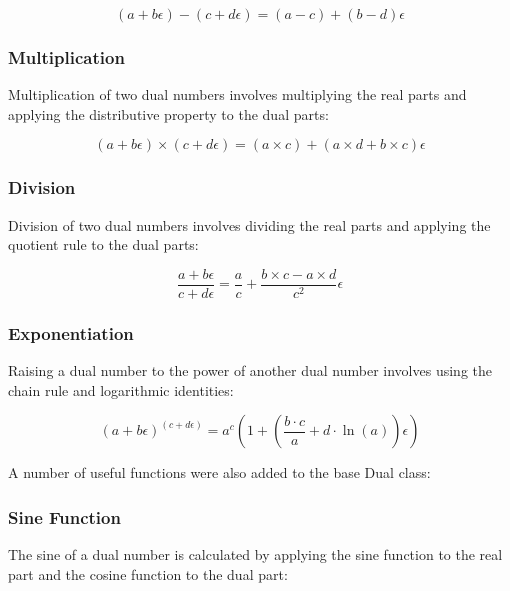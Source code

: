 \begin{equation}
    (a + b\epsilon) - (c + d\epsilon) = (a - c) + (b - d)\epsilon
    \label{eq:subtraction}
    \end{equation}

\subsubsection{Multiplication}
Multiplication of two dual numbers involves multiplying the real parts and applying the distributive property to the dual parts:

\begin{equation}
    (a + b\epsilon) \times (c + d\epsilon) = (a \times c) + (a \times d + b \times c)\epsilon
    \label{eq:multiplication}
    \end{equation}

\subsubsection{Division}
Division of two dual numbers involves dividing the real parts and applying the quotient rule to the dual parts:

\begin{equation}
    \frac{a + b\epsilon}{c + d\epsilon} = \frac{a}{c} + \frac{b \times c - a \times d}{c^2}\epsilon
    \label{eq:division}
\end{equation}

\subsubsection{Exponentiation}
Raising a dual number to the power of another dual number involves using the chain rule and logarithmic identities:

\begin{equation}
    (a + b\epsilon)^{(c + d\epsilon)} = a^c \left(1 + \left(\frac{b \cdot c}{a} + d \cdot \ln(a)\right)\epsilon\right)
    \label{eq:exponentiation}
\end{equation}

A number of useful functions were also added to the base Dual class:

\subsubsection{Sine Function}
The sine of a dual number is calculated by applying the sine function to the real part and the cosine function to the dual part:


